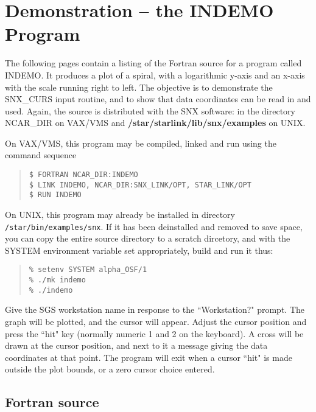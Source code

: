 \section {Demonstration -- the INDEMO Program} \label{demo3_sect}

The following pages contain a listing of the Fortran source for a program
called INDEMO.
It produces a plot of a spiral, with a logarithmic y-axis and an x-axis with
the scale running right to left.
The objective is to demonstrate the SNX\_CURS input routine, and to show that
data coordinates can be read in and used.
Again, the source is distributed with the SNX software: in the directory
NCAR\_DIR on VAX/VMS and {\bf /star/\-starlink/\-lib/\-snx/examples} on UNIX.

On VAX/VMS, this program may be compiled, linked and run using the command
sequence

\begin {quote}
\begin{verbatim}
$ FORTRAN NCAR_DIR:INDEMO
$ LINK INDEMO, NCAR_DIR:SNX_LINK/OPT, STAR_LINK/OPT
$ RUN INDEMO
\end{verbatim}
\end {quote}

On UNIX, this program may already be installed in directory 
{\tt /star/bin/examples/snx}.  If it has been deinstalled and removed to save
space, you can copy the entire source directory to a scratch dircetory, and
with the SYSTEM environment variable set appropriately, build and run it thus:

\begin {quote}
\begin{verbatim}
% setenv SYSTEM alpha_OSF/1
% ./mk indemo
% ./indemo
\end{verbatim}
\end {quote}

Give the SGS workstation name in response to the ``Workstation?" prompt.
The graph will be plotted, and the cursor will appear.
Adjust the cursor position and press the ``hit" key (normally numeric 1 and 2
on the keyboard).
A cross will be drawn at the cursor position, and next
to it a message giving the data coordinates at that point.
The program will exit when a cursor ``hit" is made outside the plot bounds,
or a zero cursor choice entered.


\subsection {Fortran source}

